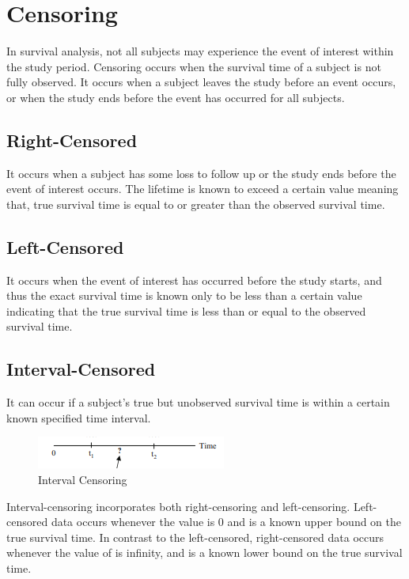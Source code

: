 \documentclass[12pt]{report}
\begin{document}
	\section{Censoring}
	
	In survival analysis, not all subjects may experience the event of interest within the study period. Censoring occurs when the survival time of a subject is not fully observed. It occurs when a subject leaves the study before an event occurs, or when the study ends before the event has occurred for all subjects.
	
	
	\subsection{Right-Censored}
	
	It occurs when a subject has some loss to follow up or the study ends before the event of interest occurs. The lifetime is known to exceed a certain value meaning that, true survival time is equal to or greater than the observed survival time.
	
	\subsection{Left-Censored}
	
	It occurs when the event of interest has occurred before the study starts, and thus the exact survival time is known only to be less than a certain value indicating that the true survival time is less than or equal to the observed survival time.
	
	\subsection{Interval-Censored}
	
	It can occur if a subject’s true but unobserved survival time is within a certain known specified time interval. 
	\begin{figure}
		\centering
		\includegraphics[width=0.5\linewidth]{Figure 3/3.1.png}
		\caption{Interval Censoring}
		\label{Figure 3.1}
	\end{figure}
	
	Interval-censoring incorporates both right-censoring and left-censoring. Left-censored data occurs whenever the value is 0 and  is a known upper bound on the true survival time. In contrast to the left-censored, right-censored data occurs whenever the value of  is infinity, and is a known lower bound on the true survival time.
	
\end{document}
